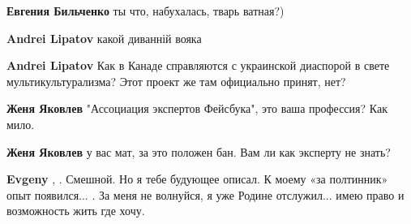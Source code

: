 \begin{itemize}
\begin{itemize}
\textbf{Евгения Бильченко} ты что, набухалась, тварь ватная?)

 
\textbf{Andrei Lipatov} какой диванній вояка \Laughey[1.0][white]

 
\textbf{Andrei Lipatov} Как в Канаде справляются с украинской диаспорой в свете мультикультурализма? Этот проект же там официально принят, нет?

 
\textbf{Женя Яковлев} "Ассоциация экспертов Фейсбука", это ваша профессия? Как мило.

 
\textbf{Женя Яковлев} у вас мат, за это положен бан. Вам ли как эксперту не знать?

 
\textbf{Evgeny} , \Smiley[1.0][yellow] \Smiley[1.0][yellow] \Smiley[1.0][yellow] . Смешной. Но я тебе будующее описал. К моему «за
полтинник» опыт появился... \Smiley[1.0][yellow] . За меня не волнуйся, я уже Родине отслужил... имею
право и возможность жить где хочу.

 

\end{itemize}
\end{itemize}
